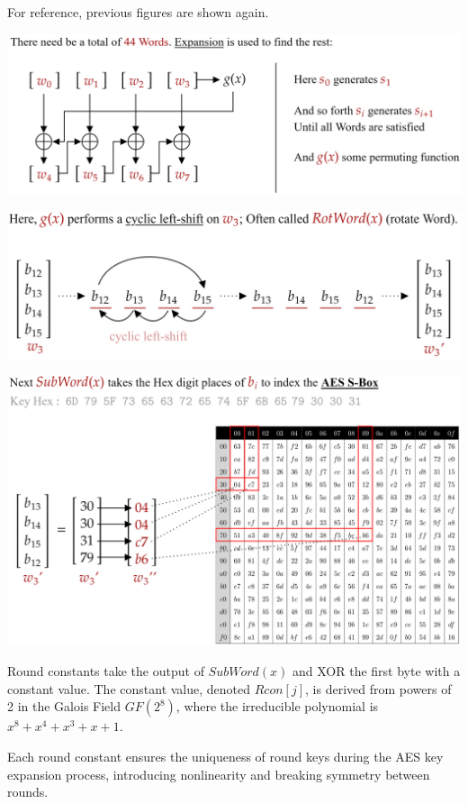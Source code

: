 \newpage 

\noindent
For reference, previous figures are shown again.

\begin{center}
    \includegraphics[width=.8\textwidth]{Sections/sec/enc/aes/round_gen.png}

    \includegraphics[width=.8\textwidth]{Sections/sec/enc/aes/g_func.png}

\end{center}

\vspace{1em}
\noindent

\hspace{-3em}
\includegraphics[width=1.1\textwidth]{Sections/sec/enc/aes/sub_word.png}

\newpage 

\begin{Def}

    \label{theo:round_constants}
    Round constants take the output of $SubWord(x)$ and XOR the first byte with a constant value.
    The constant value, denoted $Rcon[j]$, is derived from powers of 2 in the Galois Field $GF(2^8)$, where the irreducible polynomial is $x^8 + x^4 + x^3 + x + 1$.

    Each round constant ensures the uniqueness of round keys during the AES key expansion process, introducing nonlinearity and breaking symmetry between rounds.
\end{Def}

